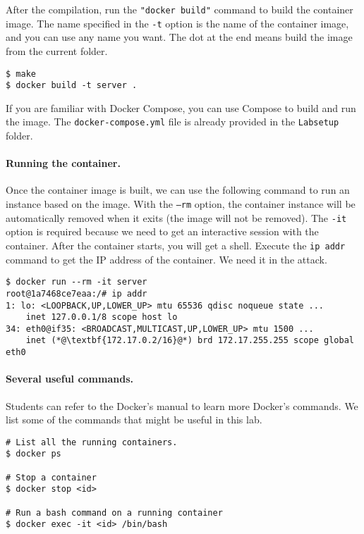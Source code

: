 After the compilation, run the 
\texttt{"docker build"} command to build the container image. 
The name specified in the \texttt{-t} option is the name of the container image, and you can
use any name you want. The dot at the end means build the image from the current folder.  

\begin{lstlisting}
$ make     
$ docker build -t server . 
\end{lstlisting}

If you are familiar with Docker Compose, you can use Compose to build and run the 
image. The \texttt{docker-compose.yml} file is already provided in the 
\texttt{Labsetup} folder.  


\paragraph{Running the container.}
Once the container image is built, we can use the following command to run an
instance based on the image. With the \texttt{--rm} option, the container instance will be 
automatically removed when it exits (the image will not be removed). 
The \texttt{-it} option is required because we need to get an interactive session
with the container. After the container starts, you will get a shell.
Execute the \texttt{ip addr} command to get the IP address of the container. 
We need it in the attack. 

\begin{lstlisting}
$ docker run --rm -it server 
root@1a7468ce7eaa:/# ip addr
1: lo: <LOOPBACK,UP,LOWER_UP> mtu 65536 qdisc noqueue state ...
    inet 127.0.0.1/8 scope host lo
34: eth0@if35: <BROADCAST,MULTICAST,UP,LOWER_UP> mtu 1500 ...
    inet (*@\textbf{172.17.0.2/16}@*) brd 172.17.255.255 scope global eth0
\end{lstlisting}



\paragraph{Several useful commands.}
Students can refer to the Docker's manual to learn more Docker's commands. 
We list some of the commands that might be useful in this lab. 

\begin{lstlisting}
# List all the running containers. 
$ docker ps 

# Stop a container 
$ docker stop <id>

# Run a bash command on a running container 
$ docker exec -it <id> /bin/bash
\end{lstlisting}
 


